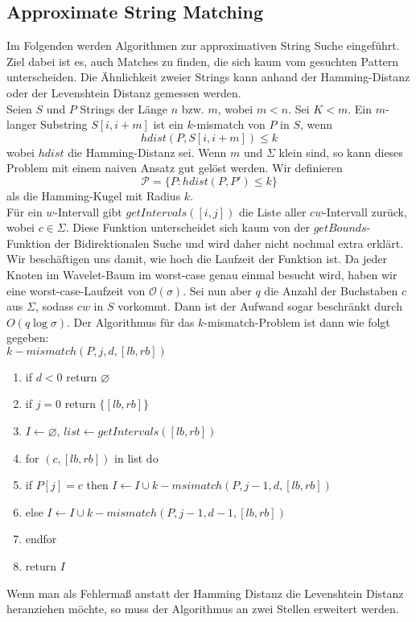 \documentclass[a4paper, 12pt]{article}
\theoremstyle{plain}
\theoremstyle{definition}
\theoremstyle{lemma}
\theoremstyle{remark}
\theoremstyle{corollary}
\theoremstyle{example}
\begin{document}
	\subsection{Approximate String Matching}
	Im Folgenden werden Algorithmen zur approximativen String Suche eingeführt. Ziel dabei ist es, auch Matches zu finden, die sich kaum vom gesuchten Pattern unterscheiden. Die Ähnlichkeit zweier Strings kann anhand der Hamming-Distanz oder der Levenshtein Distanz gemessen werden.\\
	Seien $S$ und $P$ Strings der Länge $n$ bzw. $m$, wobei $m<n$. Sei $K<m$. Ein $m$-langer Substring $S[i,i+m]$ ist ein $k$-mismatch von $P$ in $S$, wenn \[hdist(P,S[i,i+m]) \leq k\] wobei $hdist$ die Hamming-Distanz sei. Wenn $m$ und $\Sigma$ klein sind, so kann dieses Problem mit einem naiven Ansatz gut gelöst werden. Wir definieren \[\mathcal{P} = \{P: hdist(P,P') \leq k\}\] als die Hamming-Kugel mit Radius $k$.\\
	Für ein $w$-Intervall gibt $getIntervals([i,j])$ die Liste aller $cw$-Intervall zurück, wobei $c\in \Sigma$. Diese Funktion unterscheidet sich kaum von der $getBounds$-Funktion der Bidirektionalen Suche und wird daher nicht nochmal extra erklärt.\\
	Wir beschäftigen uns damit, wie hoch die Laufzeit der Funktion ist. Da jeder Knoten im Wavelet-Baum im worst-case genau einmal besucht wird, haben wir eine worst-case-Laufzeit von $\mathcal{O}(\sigma)$. Sei nun aber $q$ die Anzahl der Buchstaben $c$ aus $\Sigma$, sodass $cw$ in $S$ vorkommt. Dann ist der Aufwand sogar beschränkt durch $O(q\log \sigma)$. Der Algorithmus für das $k$-mismatch-Problem ist dann wie folgt gegeben: \\
	\underline{$k-mismatch(P,j,d,[lb,rb])$} 
	\begin{enumerate}
		\item if $d< 0$ return $\varnothing$
		\item if $j = 0$ return $\{[lb,rb]\}$
		\item $I\gets \varnothing$, $list \gets getIntervals([lb,rb])$
		\item for $(c,[lb,rb])$ in list do
		\item if $P[j]=c$ then $I\gets I\cup k-msimatch(P,j-1,d,[lb,rb])$
		\item else $I\gets I \cup k-mismatch(P,j-1,d-1,[lb,rb])$
		\item endfor
		\item return $I$
	\end{enumerate}
	Wenn man als Fehlermaß anstatt der Hamming Distanz die Levenshtein Distanz heranziehen möchte, so muss der Algorithmus an zwei Stellen erweitert werden.\\
\end{document}
